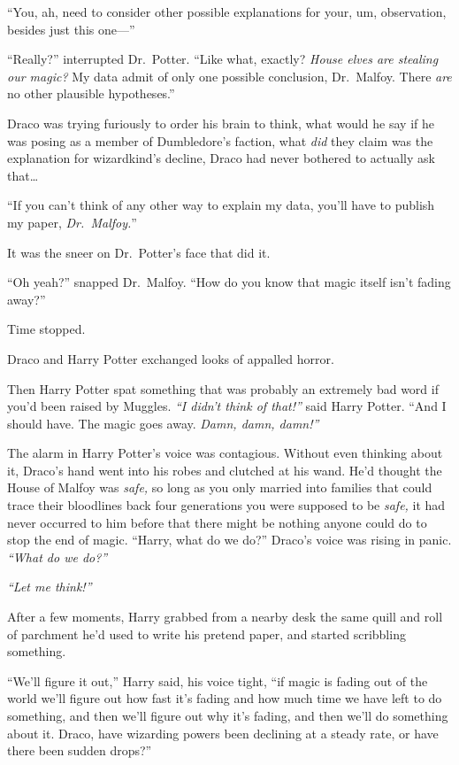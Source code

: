 ``You, ah, need to consider other possible explanations for your, um,
observation, besides just this one---''

``Really?'' interrupted Dr.~Potter. ``Like what, exactly? \emph{House
elves are stealing our magic?} My data admit of only one possible
conclusion, Dr.~Malfoy. There \emph{are} no other plausible
hypotheses.''

Draco was trying furiously to order his brain to think, what would he
say if he was posing as a member of Dumbledore's faction, what
\emph{did} they claim was the explanation for wizardkind's decline,
Draco had never bothered to actually ask that\ldots{}

``If you can't think of any other way to explain my data, you'll have to
publish my paper, \emph{Dr.~Malfoy.}''

It was the sneer on Dr.~Potter's face that did it.

``Oh yeah?'' snapped Dr.~Malfoy. ``How do you know that magic itself
isn't fading away?''

Time stopped.

Draco and Harry Potter exchanged looks of appalled horror.

Then Harry Potter spat something that was probably an extremely bad word
if you'd been raised by Muggles. \emph{``I didn't think of that!''} said
Harry Potter. ``And I should have. The magic goes away. \emph{Damn,
damn, damn!''}

The alarm in Harry Potter's voice was contagious. Without even thinking
about it, Draco's hand went into his robes and clutched at his wand.
He'd thought the House of Malfoy was \emph{safe,} so long as you only
married into families that could trace their bloodlines back four
generations you were supposed to be \emph{safe,} it had never occurred
to him before that there might be nothing anyone could do to stop the
end of magic. ``Harry, what do we do?'' Draco's voice was rising in
panic. \emph{``What do we do?''}

\emph{``Let me think!''}

After a few moments, Harry grabbed from a nearby desk the same quill and
roll of parchment he'd used to write his pretend paper, and started
scribbling something.

``We'll figure it out,'' Harry said, his voice tight, ``if magic is
fading out of the world we'll figure out how fast it's fading and how
much time we have left to do something, and then we'll figure out why
it's fading, and then we'll do something about it. Draco, have wizarding
powers been declining at a steady rate, or have there been sudden
drops?''

